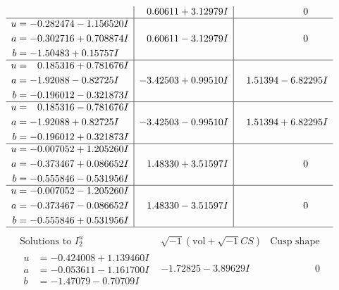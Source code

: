\documentclass[1p]{elsarticle_modified}
\theoremstyle{definition}
\newcommand{\I}{\sqrt{-1}}
\begin{document}
$$\begin{array}{c|c|c}
 & \phantom{-}0.60611 + 3.12979 I & \phantom{-0.000000 } 0 \\ \hline\begin{aligned}
u &= -0.282474 - 1.156520 I \\
a &= -0.302716 + 0.708874 I \\
b &= -1.50483 + 0.15757 I\end{aligned}
 & \phantom{-}0.60611 - 3.12979 I & \phantom{-0.000000 } 0 \\ \hline\begin{aligned}
u &= \phantom{-}0.185316 + 0.781676 I \\
a &= -1.92088 - 0.82725 I \\
b &= -0.196012 - 0.321873 I\end{aligned}
 & -3.42503 + 0.99510 I & \phantom{-}1.51394 - 6.82295 I \\ \hline\begin{aligned}
u &= \phantom{-}0.185316 - 0.781676 I \\
a &= -1.92088 + 0.82725 I \\
b &= -0.196012 + 0.321873 I\end{aligned}
 & -3.42503 - 0.99510 I & \phantom{-}1.51394 + 6.82295 I \\ \hline\begin{aligned}
u &= -0.007052 + 1.205260 I \\
a &= -0.373467 + 0.086652 I \\
b &= -0.555846 - 0.531956 I\end{aligned}
 & \phantom{-}1.48330 + 3.51597 I & \phantom{-0.000000 } 0 \\ \hline\begin{aligned}
u &= -0.007052 - 1.205260 I \\
a &= -0.373467 - 0.086652 I \\
b &= -0.555846 + 0.531956 I\end{aligned}
 & \phantom{-}1.48330 - 3.51597 I & \phantom{-0.000000 } 0\\
 \hline 
 \end{array}$$\newpage$$\begin{array}{c|c|c}  
\text{Solutions to }I^u_{2}& \I (\text{vol} + \sqrt{-1}CS) & \text{Cusp shape}\\
 \hline 
\begin{aligned}
u &= -0.424008 + 1.139460 I \\
a &= -0.053611 - 1.161700 I \\
b &= -1.47079 - 0.70709 I\end{aligned}
 & -1.72825 - 3.89629 I & \phantom{-0.000000 } 0 \\ \hline\begin{aligned}

\end{aligned}
\end{array}$$
\end{document}
